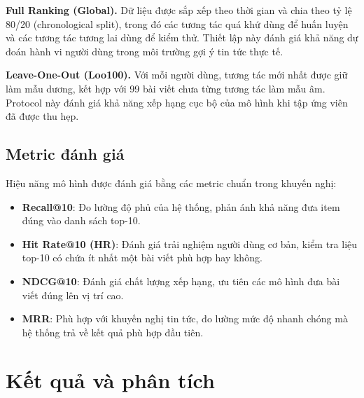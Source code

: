\documentclass[11pt]{article}
\begin{document}
\textbf{Full Ranking (Global).}
Dữ liệu được sắp xếp theo thời gian và chia theo tỷ lệ 80/20 (chronological split),
trong đó các tương tác quá khứ dùng để huấn luyện và các tương tác tương lai dùng để kiểm thử.
Thiết lập này đánh giá khả năng dự đoán hành vi người dùng trong môi trường gợi ý tin tức thực tế.

\textbf{Leave-One-Out (Loo100).}
Với mỗi người dùng, tương tác mới nhất được giữ làm mẫu dương,
kết hợp với 99 bài viết chưa từng tương tác làm mẫu âm.
Protocol này đánh giá khả năng xếp hạng cục bộ của mô hình
khi tập ứng viên đã được thu hẹp.


\subsection{Metric đánh giá}
Hiệu năng mô hình được đánh giá bằng các metric chuẩn trong khuyến nghị:
\begin{itemize}
    \item \textbf{Recall@10}: Đo lường độ phủ của hệ thống,
          phản ánh khả năng đưa item đúng vào danh sách top-10.
    \item \textbf{Hit Rate@10 (HR)}: Đánh giá trải nghiệm người dùng cơ bản,
          kiểm tra liệu top-10 có chứa ít nhất một bài viết phù hợp hay không.
    \item \textbf{NDCG@10}: Đánh giá chất lượng xếp hạng,
          ưu tiên các mô hình đưa bài viết đúng lên vị trí cao.
    \item \textbf{MRR}: Phù hợp với khuyến nghị tin tức,
          đo lường mức độ nhanh chóng mà hệ thống trả về kết quả phù hợp đầu tiên.
\end{itemize}

\section{Kết quả và phân tích}
\label{sec:results}
\end{document}

